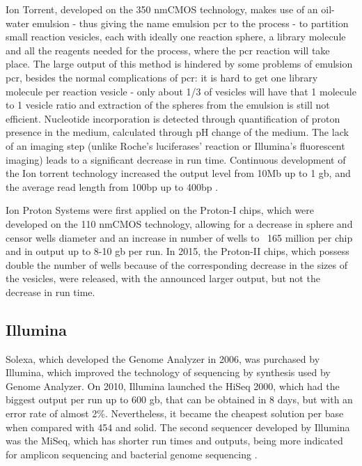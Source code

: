 \documentclass[
  oneside,
  11pt, a4paper,
  footinclude=true,
  headinclude=true,
  cleardoublepage=empty
]{scrbook}
\begin{document}
    Ion Torrent, developed on the 350 nmCMOS technology, makes use of an oil-water emulsion - thus giving the name emulsion \gls{pcr} to the process - to partition small reaction vesicles, each with ideally one reaction sphere, a library molecule and all the reagents needed for the process, where the \gls{pcr} reaction will take place. The large output of this method is hindered by some problems of emulsion \gls{pcr}, besides the normal complications of \gls{pcr}: it is hard to get one library molecule per reaction vesicle - only about 1/3 of vesicles will have that 1 molecule to 1 vesicle ratio and extraction of the spheres from the emulsion is still not efficient. Nucleotide incorporation is detected through quantification of proton presence in the medium, calculated through pH change of the medium. The lack of an imaging step (unlike Roche's luciferases' reaction or Illumina's fluorescent imaging) leads to a significant decrease in run time. Continuous development of the Ion torrent technology increased the output level from 10Mb up to 1 \gls{gb}, and the average read length from 100\gls{bp} up to 400\gls{bp} \citep{Buermans2014}.
    
    Ion Proton Systems were first applied on the Proton-I chips, which were developed on the 110 nmCMOS technology, allowing for a decrease in sphere and censor wells diameter and an increase in number of wells to ~165 million per chip and in output up to 8-10 \gls{gb} per run. In 2015, the Proton-II chips, which possess double the number of wells because of the corresponding decrease in the sizes of the vesicles, were released, with the announced larger output, but not the decrease in run time.
    
    \subsection{Illumina}
    
    Solexa, which developed the Genome Analyzer in 2006, was purchased by Illumina, which improved the technology of sequencing by synthesis used by Genome Analyzer. On 2010, Illumina launched the HiSeq 2000, which had the biggest output per run up to 600 \gls{gb}, that can be obtained in 8 days, but with an error rate of almost 2\%. Nevertheless, it became the cheapest solution per base when compared with 454 and \gls{solid}. The second sequencer developed by Illumina was the MiSeq, which has shorter run times and outputs, being more indicated for amplicon sequencing and bacterial genome sequencing \citep{Liu2012, Buermans2014}.
    
\end{document}
